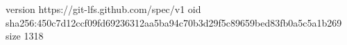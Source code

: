 version https://git-lfs.github.com/spec/v1
oid sha256:450c7d12ccf09fd69236312aa5ba94c70b3d29f5c89659bed83fb0a5c5a1b269
size 1318
